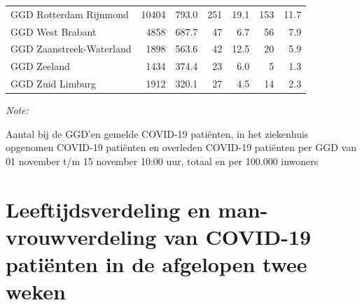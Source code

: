 \documentclass[
  english,
  man,floatsintext]{apa6}
\begin{document}
\begin{table}[H]
\begin{threeparttable}
\begin{tabular}{lrrrrrr}
GGD Rotterdam Rijnmond & 10404 & 793.0 & 251 & 19.1 & 153 & 11.7\\
GGD West Brabant & 4858 & 687.7 & 47 & 6.7 & 56 & 7.9\\
GGD Zaanstreek-Waterland & 1898 & 563.6 & 42 & 12.5 & 20 & 5.9\\
GGD Zeeland & 1434 & 374.4 & 23 & 6.0 & 5 & 1.3\\
GGD Zuid Limburg & 1912 & 320.1 & 27 & 4.5 & 14 & 2.3\\
\bottomrule
\end{tabular}
\begin{tablenotes}
\item \textit{Note: } 
\item Aantal bij de GGD’en gemelde COVID-19 patiënten, in het ziekenhuis opgenomen COVID-19 patiënten en overleden COVID-19 patiënten per GGD van 01 november t/m 15 november 10:00 uur, totaal en per 100.000 inwoners
\end{tablenotes}
\end{threeparttable}
\endgroup{}
\end{table}

\newpage

\hypertarget{leeftijdsverdeling-en-man-vrouwverdeling-van-covid-19-patiuxebnten-in-de-afgelopen-twee-weken}{%
\section{Leeftijdsverdeling en man-vrouwverdeling van COVID-19 patiënten in de afgelopen twee weken}\label{leeftijdsverdeling-en-man-vrouwverdeling-van-covid-19-patiuxebnten-in-de-afgelopen-twee-weken}}
\end{document}
